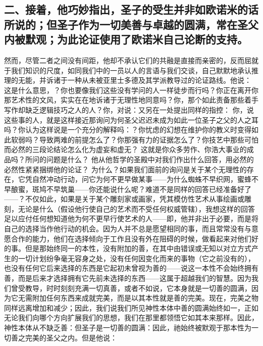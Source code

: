 \subsection{二、接着，他巧妙指出，圣子的受生并非如欧诺米的话所说的；但圣子作为一切美善与卓越的圆满，常在圣父内被默观；为此论证使用了欧诺米自己论断的支持。}

然而，尽管二者之间没有间距，他却不承认它们的共融是直接而亲密的，反而屈就于我们知识的尺度，如同我们中的一员以人的言语与我们交谈，自己默默地承认推理的无能，并诉诸于一种从未被亚里士多德及其学派教导过的论证路线。他说： 这是什么意思，？你也要像我们这些没有学问的人一样徒步而行吗？你正在离开你那艺术性的文风，实实在在地诉诸于无理性地同意吗？你，那个如此责备那些着手写作却缺乏逻辑技巧之人的人？你，对说：又另在一处提出同样的指控： 你，说这些事的人，就是这样接近那询问为何圣父迟迟未成为如此一位圣子之父的人之耳吗？你认为这样说是一个充分的解释吗：？你忧虑的幻想在维护你的教义时变得如此软弱吗？导致两难的前提怎么了？你那强有力的证据怎么了？你技艺中那些可怕而必然的三段论结论怎么化为虚妄和虚无？ 这就是你众多劳作、你浩大事业的成品吗？所问的问题是什么？ 他从他哲学的圣殿中对我们作出什么回答，用必然的必然性紧紧捆绑他的论证？ 为什么？如果我们面前的询问是关于某个无理性的存在，它凭自然冲动行动，问它为何不更早做某事——为什么蜘蛛不早织网，蜜蜂不早酿蜜，斑鸠不早筑巢——你还能说什么呢？难道不是同样的回答已经准备好了——？不仅如此，如果是关于某个雕刻家或画家，凭其模仿性艺术从事绘画或雕刻，无论是什么（假设他行使自己的艺术而不受任何权威管辖），我想这样的回答足以应付任何想知道他为何不更早行使艺术的人——即，他并非出于必要，而是将自己的选择当作他行动的机会。因为人并不总是愿望相同的事，而且常常没有与意愿合作的能力，他们在选择倾向于工作且没有外在阻碍的时候，做看起来对他们好的事。但是那始终同一的本性，没有附加的善，在其中由错误或无知以对立方式产生的一切计划纷争毫无容身之处，没有任何因变化而来的事物（它之前没有的），也没有任何它后来选择的东西是它起初未曾视为善的——说这一本性不会始终拥有善，而是后来才选择拥有它先前未选择的东西——这属于超越我们的智慧。因为我们曾受教导，时时刻刻充满一切真善，或者不如说，它本身就是一切善的圆满，因为它无需附加任何东西来成就完美，而是以其本性就是善的完美。现在，完美之物同样远离增加和减少；因此，我们说我们所见神性本体中善的圆满始终如一，正如无论我们向哪个方向扩展我们的思想，我们在那里都领悟它如其本来那样。因此，神性本体从不缺乏善：但圣子是一切善的圆满：因此，祂始终被默观于那本性为一切善之完美的圣父之内。但是他说： 